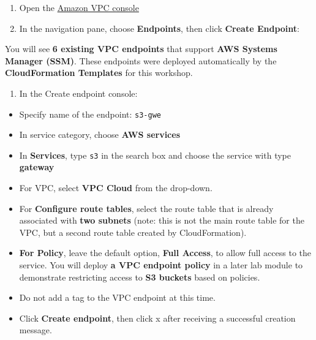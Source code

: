 \begin{enumerate}
\def\labelenumi{\arabic{enumi}.}
\tightlist
\item
  Open the
  \href{https://us-east-1.console.aws.amazon.com/vpc/home?region=us-east-1\#Home:}{Amazon
  VPC console}
\item
  In the navigation pane, choose \textbf{Endpoints}, then click
  \textbf{Create Endpoint}:
\end{enumerate}

You will see \textbf{6 existing VPC endpoints} that support \textbf{AWS
Systems Manager (SSM)}. These endpoints were deployed automatically by
the \textbf{CloudFormation Templates} for this workshop.

\begin{enumerate}
\def\labelenumi{\arabic{enumi}.}
\setcounter{enumi}{2}
\tightlist
\item
  In the Create endpoint console:
\end{enumerate}

\begin{itemize}
\item
  Specify name of the endpoint: \texttt{s3-\allowbreak{}gwe}
\item
  In service category, choose \textbf{AWS services}
\item
  In \textbf{Services}, type \texttt{s3} in the search box and choose
  the service with type \textbf{gateway}
\item
  For VPC, select \textbf{VPC Cloud} from the drop-down.
\item
  For \textbf{Configure route tables}, select the route table that is
  already associated with \textbf{two subnets} (note: this is not the
  main route table for the VPC, but a second route table created by
  CloudFormation).
\item
  \textbf{For Policy}, leave the default option, \textbf{Full Access},
  to allow full access to the service. You will deploy \textbf{a VPC
  endpoint policy} in a later lab module to demonstrate restricting
  access to \textbf{S3 buckets} based on policies.
\item
  Do not add a tag to the VPC endpoint at this time.
\item
  Click \textbf{Create endpoint}, then click x after receiving a
  successful creation message.
\end{itemize}
